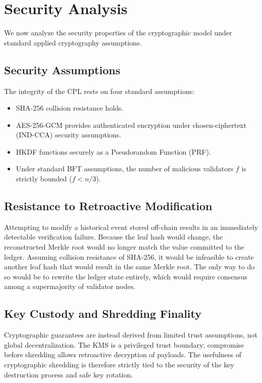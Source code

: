 \documentclass[conference]{IEEEtran}
\begin{document}
\section{Security Analysis}

We now analyze the security properties of the cryptographic model under standard applied cryptography assumptions.

\subsection{Security Assumptions}
The integrity of the CPL rests on four standard assumptions:
\begin{itemize}
    \item SHA-256 collision resistance holds.
    \item AES-256-GCM provides authenticated encryption under chosen-ciphertext (IND-CCA) security assumptions.
    \item HKDF functions securely as a Pseudorandom Function (PRF).
    \item Under standard BFT assumptions, the number of malicious validators $f$ is strictly bounded ($f < n/3$).
\end{itemize}

\subsection{Resistance to Retroactive Modification}

Attempting to modify a historical event stored off-chain results in an immediately detectable verification failure. Because the leaf hash would change, the reconstructed Merkle root would no longer match the value committed to the ledger. Assuming collision resistance of SHA-256, it would be infeasible to create another leaf hash that would result in the same Merkle root. The only way to do so would be to rewrite the ledger state entirely, which would require consensus among a supermajority of validator nodes.

\subsection{Key Custody and Shredding Finality}
Cryptographic guarantees are instead derived from limited trust assumptions, not global decentralization. The KMS is a privileged trust boundary; compromise before shredding allows retroactive decryption of payloads. The usefulness of cryptographic shredding is therefore strictly tied to the security of the key destruction process and safe key rotation.
\end{document}
